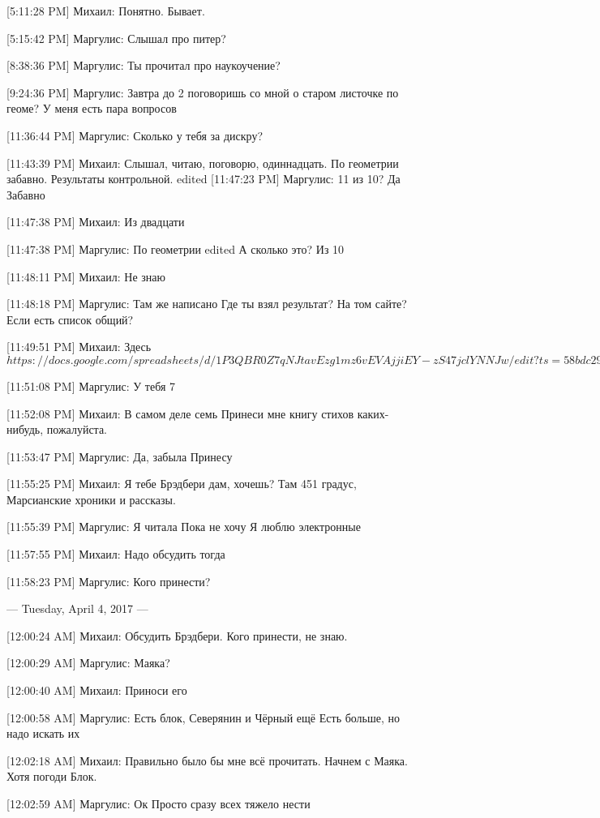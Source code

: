 \documentclass{article}
\begin{document}
[5:11:28 PM] Михаил:
Понятно. Бывает.

[5:15:42 PM] Маргулис:
Слышал про питер?

[8:38:36 PM] Маргулис:
Ты прочитал про наукоучение?

[9:24:36 PM] Маргулис:
Завтра до 2 поговоришь со мной о старом листочке по геоме? У меня есть пара вопросов

[11:36:44 PM] Маргулис:
Сколько у тебя за дискру?

[11:43:39 PM] Михаил:
Слышал, читаю, поговорю, одиннадцать.
 По геометрии забавно.
 Результаты контрольной.
edited 
[11:47:23 PM] Маргулис:
11 из 10?
 Да
 Забавно

[11:47:38 PM] Михаил:
Из двадцати

[11:47:38 PM] Маргулис:
По геометрии
edited 
А сколько это?
 Из 10

[11:48:11 PM] Михаил:
Не знаю

[11:48:18 PM] Маргулис:
Там же написано
 Где ты взял результат?
 На том сайте?
 Если есть список общий?

[11:49:51 PM] Михаил:
Здесь$ https://docs.google.com/spreadsheets/d/1P3QBR0Z7qNJtavEzg1mz6vEVAjjiEY-zS47jclYNNJw/edit?ts=58bdc296gid=1255350898$

[11:51:08 PM] Маргулис:
У тебя 7

[11:52:08 PM] Михаил:
В самом деле семь
 Принеси мне книгу стихов каких-нибудь, пожалуйста.

[11:53:47 PM] Маргулис:
Да, забыла
 Принесу

[11:55:25 PM] Михаил:
Я тебе Брэдбери дам, хочешь? Там 451 градус, Марсианские хроники и рассказы.

[11:55:39 PM] Маргулис:
Я читала
 Пока не хочу
 Я люблю электронные

[11:57:55 PM] Михаил:
Надо обсудить тогда

[11:58:23 PM] Маргулис:
Кого принести?

--- Tuesday, April 4, 2017 ---

[12:00:24 AM] Михаил:
Обсудить Брэдбери. Кого принести, не знаю.

[12:00:29 AM] Маргулис:
Маяка?

[12:00:40 AM] Михаил:
Приноси его

[12:00:58 AM] Маргулис:
Есть блок, Северянин и Чёрный ещё
 Есть больше, но надо искать их

[12:02:18 AM] Михаил:
Правильно было бы мне всё прочитать. Начнем с Маяка.
 Хотя погоди
 Блок.

[12:02:59 AM] Маргулис:
Ок
 Просто сразу всех тяжело нести
\end{document}
